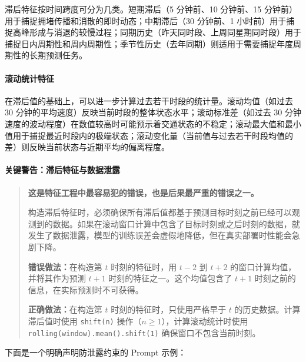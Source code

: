 滞后特征按时间跨度可分为几类。短期滞后（5 分钟前、10 分钟前、15 分钟前）用于捕捉拥堵传播和消散的即时动态；中期滞后（30 分钟前、1 小时前）用于捕捉高峰形成与消退的较慢过程；同期历史（昨天同时段、上周同星期同时段）用于捕捉日内周期性和周内周期性；季节性历史（去年同期）则适用于需要捕捉年度周期性的长期预测任务。

\paragraph{滚动统计特征}

在滞后值的基础上，可以进一步计算过去若干时段的统计量。滚动均值（如过去 30 分钟的平均速度）反映当前时段的整体状态水平；滚动标准差（如过去 30 分钟速度的波动程度）在数值较高时可能预示着交通状态的不稳定；滚动最大值和最小值用于捕捉最近时段内的极端状态；滚动变化量（当前值与过去若干时段均值的差）则反映当前状态与近期平均的偏离程度。

\paragraph{关键警告：滞后特征与数据泄露}

\begin{quote}
\textbf{这是特征工程中最容易犯的错误，也是后果最严重的错误之一。}

构造滞后特征时，必须确保所有滞后值都基于预测目标时刻之前已经可以观测到的数据。如果在滚动窗口计算中包含了目标时刻或之后时刻的数据，就发生了数据泄露，模型的训练误差会虚假地降低，但在真实部署时性能会急剧下降。

\textbf{错误做法：}在构造第 $t$ 时刻的特征时，用 $t-2$ 到 $t+2$ 的窗口计算均值，并将其作为预测 $t+1$ 时刻的特征之一。这个均值包含了 $t+1$ 时刻之前的信息，在实际预测时不可获得。

\textbf{正确做法：}在构造第 $t$ 时刻的特征时，只使用严格早于 $t$ 的历史数据。计算滞后值时使用 \texttt{shift(n)} 操作（$n \geq 1$），计算滚动统计时使用 \texttt{rolling(window).mean().shift(1)} 确保窗口不包含当前时刻。
\end{quote}

下面是一个明确声明防泄露约束的 Prompt 示例：

